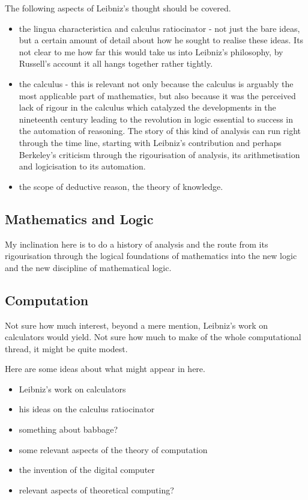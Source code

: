 \documentclass{rbjk}
\begin{document}
\begin{article}
The following aspects of Leibniz's thought should be covered.
\begin{itemize}
\item the lingua characteristica and calculus ratiocinator - not just the bare ideas, but a certain amount of detail about how he sought to realise these ideas.
Its not clear to me how far this would take us into Leibniz's philosophy, by Russell's account it all hangs together rather tightly.
\item the calculus - this is relevant not only because the calculus is arguably the most applicable part of mathematics, but also because it was the perceived lack of rigour in the calculus which catalyzed the developments in the nineteenth century leading to the revolution in logic essential to success in the automation of reasoning.
The story of this kind of analysis can run right through the time line, starting with Leibniz's contribution and perhaps Berkeley's criticism through the rigourisation of analysis, its arithmetisation and logicisation to its automation.
\item the scope of deductive reason, the theory of knowledge.
\end{itemize}

\subsection{Mathematics and Logic}

My inclination here is to do a history of analysis and the route from its rigourisation through the logical foundations of mathematics into the new logic and the new discipline of mathematical logic.


\subsection{Computation}

Not sure how much interest, beyond a mere mention, Leibniz's work on calculators would yield.
Not sure how much to make of the whole computational thread, it might be quite modest.

Here are some ideas about what might appear in here.

\begin{itemize}
\item Leibniz's work on calculators
\item his ideas on the calculus ratiocinator
\item something about babbage?
\item some relevant aspects of the theory of computation
\item the invention of the digital computer
\item relevant aspects of theoretical computing?
\end{itemize}


\end{article}
\end{document}
